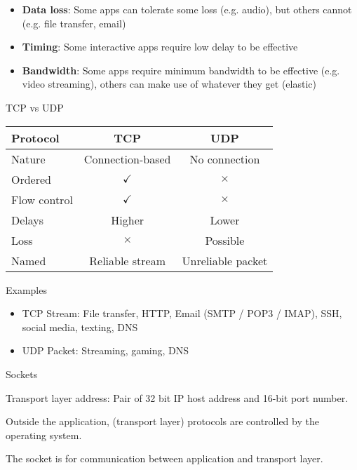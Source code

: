 \begin{itemize}
    \item \textbf{Data loss}: Some apps can tolerate some loss (e.g. audio), but others cannot (e.g. file transfer, email)
    \item \textbf{Timing}: Some interactive apps require low delay to be effective
    \item \textbf{Bandwidth}: Some apps require minimum bandwidth to be effective (e.g. video streaming), others can make use of whatever they get (elastic)
\end{itemize}

\begin{definition}
    {TCP vs UDP}

    \begin{tabular}{|l|c|c|}
        \hline
        Protocol     & TCP              & UDP               \\
        \hline
        Nature       & Connection-based & No connection     \\
        Ordered      & $\checkmark$     & $\times$          \\
        Flow control & $\checkmark$     & $\times$          \\
        Delays       & Higher           & Lower             \\
        Loss         & $\times$         & Possible          \\
        Named        & Reliable stream  & Unreliable packet \\
        \hline
    \end{tabular}

    Examples
    \begin{itemize}
        \item TCP Stream: File transfer, HTTP, Email (SMTP / POP3 / IMAP), SSH, social media, texting, DNS
        \item UDP Packet: Streaming, gaming, DNS
    \end{itemize}
\end{definition}

\begin{theorem}
    {Sockets}

    Transport layer address: Pair of 32 bit IP host address and 16-bit port number.

    Outside the application, (transport layer) protocols are controlled by the operating system.

    The socket is for communication between application and transport layer.
\end{theorem}

